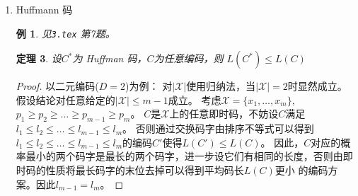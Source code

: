\documentclass{article}
\newtheorem{thm}{定理}
\newtheorem{remark}{注}
\newtheorem{eg}{例}
\DeclarePairedDelimiter\ceil{\lceil}{\rceil}
\begin{document}
\begin{enumerate}
\begin{proof}[证明]
\end{proof}
\begin{thm}
任给即时码$C$,$L(C)=\sum_{x\in \mathcal{X}} p(x)l(x)$成为$C$的平均码长，则有$L(C)\geq H_D(X)$，且等号成立的充要条件是$D^{-l_i} = p_i$
\end{thm}
\begin{remark}
使得$L(C)$最小的码称为最优码。
\end{remark}
\begin{proof}
由定理\ref{thm:Kraft}，设$r=\sum_{x\in \mathcal{X}} D^{-l(x)}\leq 1$
则$q(x) = \frac{D^{-l(x)}}{r}$ 是一个概率分布。
\begin{align*}
    L(C) - H_D(X) & = \sum_{x \in \mathcal{X}} p(x)[l(x)+\log_D(p(x))] \\
                  & = \sum_{x \in \mathcal{X}} p(x)[\log_D(p(x))-\log_D D^{-l(x)}] \\
                  & = \sum_{x \in \mathcal{X}} p(x)\left[\log_D(p(x))-\log_D \frac{D^{-l(x)}}{r}\right] -\log_D r \\
                  & = D(p || q) -\log_D r \\
                  &\geq 0
\end{align*}
上式等号成立当且仅当$r=1$且$p=q$，即$D^{-l_i} = p_i$，从而要求$-\log_D p_i$ 为整数。
\end{proof}
\begin{thm}
    设$C$为最优码，则 $L(C) < H_D(X) + 1 $
\end{thm}
\begin{proof}
只需构造一种编码方式$C'$使得$L(C') < H_D(X)+1$。
为此，
设$X\sim p(x),p(x_i)=p_i,$ 取 $ l_i = \ceil{-\log_D p_i} $
因为 $ l_i \geq \log_D p_i \Rightarrow D^{-l_i}\leq p_i \Rightarrow \sum_i D^{-l_i} \leq 1 $
所以存在一种即时码$C'$ 码长分别为 $ l_i $。
另一方面 $l_i < -\log_D p_i +1 \Rightarrow$
$$
L(C) = \sum_i p_i l_i < \sum_i p_i(-\log_D p_i + 1) = H_D(X)+1
$$
\end{proof}
\item Huffmann 码

\begin{eg}
见\texttt{3.tex} 第7题。
\end{eg}
\begin{thm}
设$C^*$为 Huffman 码，$C$为任意编码，则 $L(C^*)\leq L(C)$
\end{thm}
\begin{proof}
以二元编码($D=2$)为例：
对$|\mathcal{X}|$使用归纳法，当$|\mathcal{X}|=2$时显然成立。假设结论对任意给定的$|\mathcal{X}|\leq m-1$成立。
考虑$\mathcal{X}=\{x_1,\dots,x_m\}$,$p_1\geq p_2\geq\dots\geq p_{m-1}\geq p_m$。
$C$是$\mathcal{X}$上的任意即时码，不妨设$C$满足$l_1 \leq l_2 \leq \dots \leq l_{m-1}\leq l_m$。
否则通过交换码字由排序不等式可以得到$l_1 \leq l_2 \leq \dots \leq l_{m-1}\leq l_m$的编码$C'$使得$L(C')\leq L(C)$。
因此，$C$对应的概率最小的两个码字是最长的两个码字，进一步设它们有相同的长度，否则由即时码的性质将最长码字的末位去掉可以得到平均码长$L(C)$更小
的编码方案。因此$l_{m-1}=l_m$。


\end{proof}
\end{enumerate}
\end{document}
